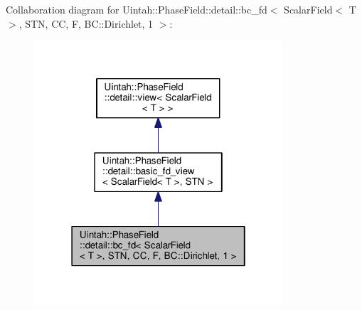 Collaboration diagram for Uintah\+:\+:Phase\+Field\+:\+:detail\+:\+:bc\+\_\+fd$<$ Scalar\+Field$<$ T $>$, S\+TN, CC, F, BC\+:\+:Dirichlet, 1 $>$\+:\nopagebreak
\begin{figure}[H]
\begin{center}
\leavevmode
\includegraphics[width=262pt]{classUintah_1_1PhaseField_1_1detail_1_1bc__fd_3_01ScalarField_3_01T_01_4_00_01STN_00_01CC_00_01F5195a5e9bda779df4f8927144fe0fc8b}
\end{center}
\end{figure}
